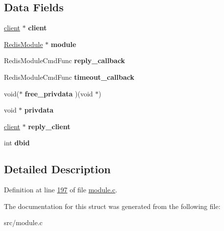 \subsection*{Data Fields}
\begin{DoxyCompactItemize}
\item 
\mbox{\label{structRedisModuleBlockedClient_aec542b16327a758fd6afadde138f12f3}} 
\hyperlink{structclient}{client} $\ast$ {\bfseries client}
\item 
\mbox{\label{structRedisModuleBlockedClient_a191286bfe6d13cb37c9de588475f3a9b}} 
\hyperlink{structRedisModule}{Redis\+Module} $\ast$ {\bfseries module}
\item 
\mbox{\label{structRedisModuleBlockedClient_adaa82b06c0799afd94e6876509412fc0}} 
Redis\+Module\+Cmd\+Func {\bfseries reply\+\_\+callback}
\item 
\mbox{\label{structRedisModuleBlockedClient_a1da2167c76770cc76afc2ee8402582ce}} 
Redis\+Module\+Cmd\+Func {\bfseries timeout\+\_\+callback}
\item 
\mbox{\label{structRedisModuleBlockedClient_a0ab7957add7b46a28c76c724b72ef46c}} 
void($\ast$ {\bfseries free\+\_\+privdata} )(void $\ast$)
\item 
\mbox{\label{structRedisModuleBlockedClient_abfd4e58e2886c30f159d36bf792aad41}} 
void $\ast$ {\bfseries privdata}
\item 
\mbox{\label{structRedisModuleBlockedClient_a58e72330030a5ebc62a9873556b9687e}} 
\hyperlink{structclient}{client} $\ast$ {\bfseries reply\+\_\+client}
\item 
\mbox{\label{structRedisModuleBlockedClient_ab85edf949c25d0e3343395499c62fd2e}} 
int {\bfseries dbid}
\end{DoxyCompactItemize}


\subsection{Detailed Description}


Definition at line \hyperlink{module_8c_source_l00197}{197} of file \hyperlink{module_8c_source}{module.\+c}.



The documentation for this struct was generated from the following file\+:\begin{DoxyCompactItemize}
\item 
src/module.\+c\end{DoxyCompactItemize}
